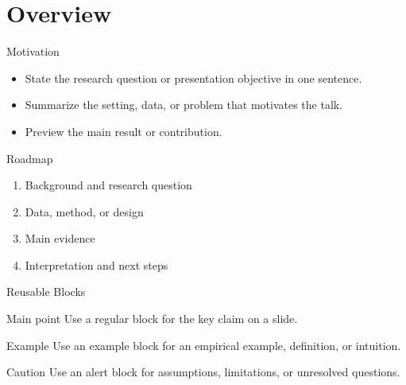﻿\section{Overview}

\begin{frame}{Motivation}
\begin{itemize}
  \item State the research question or presentation objective in one sentence.
  \item Summarize the setting, data, or problem that motivates the talk.
  \item Preview the main result or contribution.
\end{itemize}
\end{frame}

\begin{frame}{Roadmap}
\begin{enumerate}
  \item Background and research question
  \item Data, method, or design
  \item Main evidence
  \item Interpretation and next steps
\end{enumerate}
\end{frame}

\begin{frame}{Reusable Blocks}
\begin{block}{Main point}
Use a regular block for the key claim on a slide.
\end{block}

\begin{exampleblock}{Example}
Use an example block for an empirical example, definition, or intuition.
\end{exampleblock}

\begin{alertblock}{Caution}
Use an alert block for assumptions, limitations, or unresolved questions.
\end{alertblock}
\end{frame}
